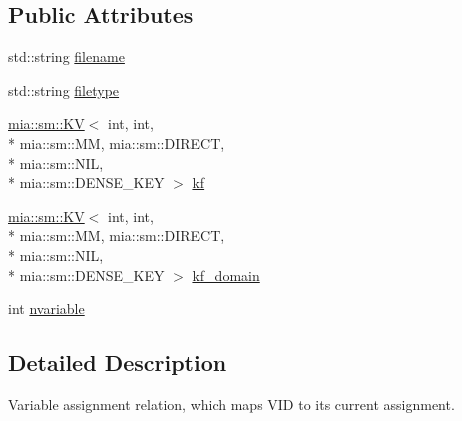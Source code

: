 \subsection*{Public Attributes}
\begin{DoxyCompactItemize}
\item 
std\-::string \hyperlink{classmia_1_1elly_1_1dstruct_1_1_variable_assignment_relation_aa48ef4351b3b43eaa3323cb20abb3531}{filename}
\item 
std\-::string \hyperlink{classmia_1_1elly_1_1dstruct_1_1_variable_assignment_relation_a52e11bd663360277cfc7c7be61d79990}{filetype}
\item 
\hyperlink{classmia_1_1sm_1_1_k_v}{mia\-::sm\-::\-K\-V}$<$ int, int, \\*
mia\-::sm\-::\-M\-M, mia\-::sm\-::\-D\-I\-R\-E\-C\-T, \\*
mia\-::sm\-::\-N\-I\-L, \\*
mia\-::sm\-::\-D\-E\-N\-S\-E\-\_\-\-K\-E\-Y $>$ \hyperlink{classmia_1_1elly_1_1dstruct_1_1_variable_assignment_relation_a1af337a9c0dcbd5fd8413c45df023017}{kf}
\item 
\hyperlink{classmia_1_1sm_1_1_k_v}{mia\-::sm\-::\-K\-V}$<$ int, int, \\*
mia\-::sm\-::\-M\-M, mia\-::sm\-::\-D\-I\-R\-E\-C\-T, \\*
mia\-::sm\-::\-N\-I\-L, \\*
mia\-::sm\-::\-D\-E\-N\-S\-E\-\_\-\-K\-E\-Y $>$ \hyperlink{classmia_1_1elly_1_1dstruct_1_1_variable_assignment_relation_ad26195bd52815d772770a07d65d755f5}{kf\-\_\-domain}
\item 
int \hyperlink{classmia_1_1elly_1_1dstruct_1_1_variable_assignment_relation_ad2dca4f9ea916afc044726130e6f8312}{nvariable}
\end{DoxyCompactItemize}


\subsection{Detailed Description}
Variable assignment relation, which maps V\-I\-D to its current assignment. 

